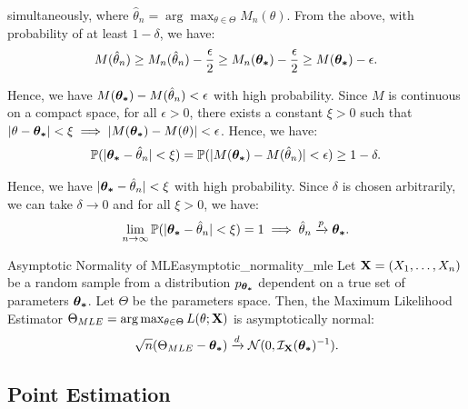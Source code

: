 \begin{proof*}
    \noindent simultaneously, where $\hat\theta_n = \arg\max_{\theta\in\Theta}M_n(\theta)$. From the above, with probability of at least $1-\delta$, we have:
    \begin{align*}
        M(\hat\theta_n) \ge M_n(\hat\theta_n) - \frac{\epsilon}{2} \ge M_n(\boldsymbol{\theta_*}) - \frac{\epsilon}{2} \ge M(\boldsymbol{\theta_*}) - \epsilon.
    \end{align*} 

    \noindent Hence, we have $M(\boldsymbol{\theta_*}) - M(\hat\theta_n) < \epsilon$ with high probability. Since $M$ is continuous on a compact space, for all $\epsilon>0$, there exists a constant $\xi>0$ such that $|\theta - \boldsymbol{\theta_*}| < \xi \implies |M(\boldsymbol{\theta_*}) - M(\theta)|<\epsilon$. Hence, we have:
    \begin{align*}
        \mathbb{P}(|\boldsymbol{\theta_*} - \hat\theta_n| < \xi) = \mathbb{P}(|M(\boldsymbol{\theta_*})-M(\hat\theta_n)| < \epsilon) \ge 1 - \delta.  
    \end{align*}   

    \noindent Hence, we have $|\boldsymbol{\theta_*}-\hat\theta_n|<\xi$ with high probability. Since $\delta$ is chosen arbitrarily, we can take $\delta\to0$ and for all $\xi>0$, we have: 
    \begin{align*}
        \lim_{n\to\infty}\mathbb{P}(|\boldsymbol{\theta_*}-\hat\theta_n|<\xi) = 1 \implies \hat\theta_n \xrightarrow{p} \boldsymbol{\theta_*}. 
    \end{align*} 
\end{proof*} 

\begin{proposition}{Asymptotic Normality of MLE}{asymptotic_normality_mle}
    Let ${\bf X}=(X_1, \dots, X_n)$ be a random sample from a distribution $p_{\boldsymbol{\theta_*}}$ dependent on a true set of parameters $\boldsymbol{\theta_*}$. Let $\Theta$ be the parameters space. Then, the Maximum Likelihood Estimator $\Theta_{MLE} = \arg\max_{\theta\in\Theta}L(\theta;{\bf X})$ is asymptotically normal:
    \begin{equation}
        \sqrt{n}(\Theta_{MLE} - \boldsymbol{\theta_*}) \xrightarrow{d} \mathcal{N}(0, \mathcal{I}_{{\bf X}}(\boldsymbol{\theta_*})^{-1}).
    \end{equation}
\end{proposition} 

\begin{proof*}
    
\end{proof*}

\subsection{Point Estimation}
\newcommand{\RB}{\hyperref[thm:rao_blackwell_theorem]{(\mathrm{{\bf RB}})}}
\newcommand{\CRLB}{\hyperref[thm:cramer_rao_lowerbound]{(\mathrm{{\bf CRLB}})}}

